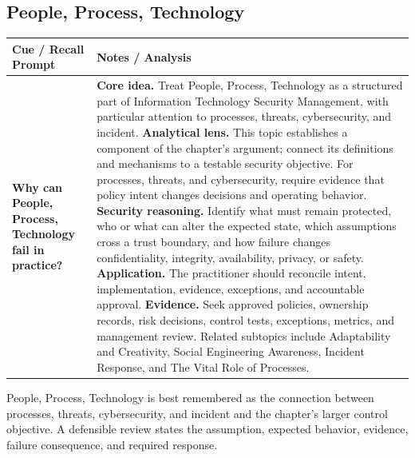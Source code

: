 \documentclass[11pt]{article}
\newcommand{\CornellHeader}{%
\rowcolor{Navy}\color{white}\bfseries Cue / Recall Prompt & \color{white}\bfseries Notes / Analysis\\\hline}
\newcommand{\CornellRow}[2]{%
\cellcolor{CueGray}\RaggedRight\textbf{#1} & \RaggedRight #2\\\hline}
\begin{document}
\subsection*{People, Process, Technology}
\begin{longtable}{>{\RaggedRight\arraybackslash}p{}|>{\RaggedRight\arraybackslash}p{}}
\CornellHeader
\CornellRow{Why can People, Process, Technology fail in practice?}{\textbf{Core idea.} Treat People, Process, Technology as a structured part of Information Technology Security Management, with particular attention to processes, threats, cybersecurity, and incident. \textbf{Analytical lens.} This topic establishes a component of the chapter's argument; connect its definitions and mechanisms to a testable security objective. For processes, threats, and cybersecurity, require evidence that policy intent changes decisions and operating behavior. \textbf{Security reasoning.} Identify what must remain protected, who or what can alter the expected state, which assumptions cross a trust boundary, and how failure changes confidentiality, integrity, availability, privacy, or safety. \textbf{Application.} The practitioner should reconcile intent, implementation, evidence, exceptions, and accountable approval. \textbf{Evidence.} Seek approved policies, ownership records, risk decisions, control tests, exceptions, metrics, and management review. Related subtopics include Adaptability and Creativity, Social Engineering Awareness, Incident Response, and The Vital Role of Processes.}
\end{longtable}
\begin{topicsummary}
People, Process, Technology is best remembered as the connection between processes, threats, cybersecurity, and incident and the chapter's larger control objective. A defensible review states the assumption, expected behavior, evidence, failure consequence, and required response.
\end{topicsummary}
\end{document}
